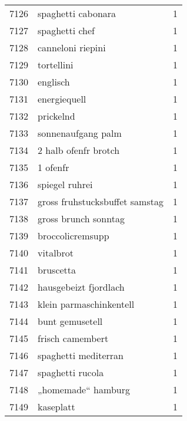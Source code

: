\begin{tabular}{llr}
7126 &                                 spaghetti cabonara &      1 \\
7127 &                                     spaghetti chef &      1 \\
7128 &                                  canneloni riepini &      1 \\
7129 &                                         tortellini &      1 \\
7130 &                                           englisch &      1 \\
7131 &                                       energiequell &      1 \\
7132 &                                          prickelnd &      1 \\
7133 &                                 sonnenaufgang palm &      1 \\
7134 &                               2 halb ofenfr brotch &      1 \\
7135 &                                           1 ofenfr &      1 \\
7136 &                                     spiegel ruhrei &      1 \\
7137 &                     gross fruhstucksbuffet samstag &      1 \\
7138 &                               gross brunch sonntag &      1 \\
7139 &                                   broccolicremsupp &      1 \\
7140 &                                          vitalbrot &      1 \\
7141 &                                          bruscetta &      1 \\
7142 &                              hausgebeizt fjordlach &      1 \\
7143 &                            klein parmaschinkentell &      1 \\
7144 &                                    bunt gemusetell &      1 \\
7145 &                                   frisch camembert &      1 \\
7146 &                               spaghetti mediterran &      1 \\
7147 &                                   spaghetti rucola &      1 \\
7148 &                                 „homemade“ hamburg &      1 \\
7149 &                                          kaseplatt &      1 \\

\end{tabular}
